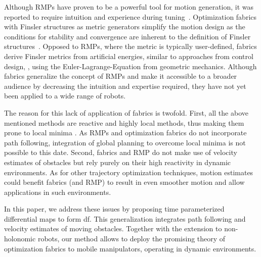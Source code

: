 Although RMPs have proven to be a powerful tool for
motion generation, it was reported to require intuition and experience
during tuning~\cite{Ratliff2020}. Optimization fabrics with Finsler structures
as metric generators simplify the motion design as the conditions for stability
and convergence are inherent to the definition of Finsler
structures~\cite{Ratliff2020,Ratliff2021}. Opposed to RMPs, where the metric is
typically user-defined, fabrics derive Finsler metrics from artificial
energies, similar to approaches from control design, \cite{l2,l3}, using the
Euler-Lagrange-Equation from geometric mechanics. Although fabrics generalize
the concept of RMPs and make it accessible to a broader audience by
decreasing the intuition and expertise required, they have not yet been applied
to a wide range of robots. 

The reason for this lack of application of fabrics is twofold. First, all the
above mentioned methods are reactive and highly local methods, thus making them
prone to local minima \cite{Bhardwaj2021}. As RMPs and optimization
fabrics do not incorporate path following, integration of global
planning to overcome local minima is not possible to this date. Second, fabrics
and RMP do not make use of velocity estimates of obstacles but rely purely on
their high reactivity in dynamic environments. As for other trajectory
optimization techniques, motion estimates could benefit fabrics (and RMP) to
result in even smoother motion and allow applications in such environments. 

In this paper, we address these issues by proposing time parameterized
differential maps to form \acl{df}. This generalization integrates
path following and velocity estimates of moving
obstacles. Together with the extension to non-holonomic robots, our method
allows to deploy the promising theory of optimization fabrics to mobile
manipulators, operating in dynamic environments.

